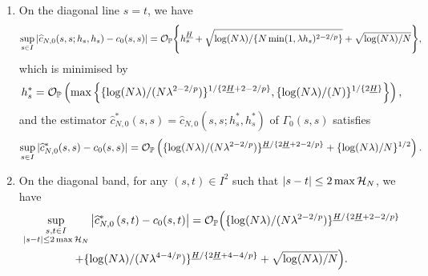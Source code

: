 \documentclass{article}
\begin{document}
\begin{theorem}
\begin{enumerate}
	\item \label{eq:thm:cov_unif_cv_diagonal} On the diagonal line $s=t$, we have
	 	\begin{equation}
	 		\sup_{s\in I} \left|\widehat c_{N,0} (s,s;h_s,h_s) -  c_0 (s,s)\right| =  \mathcal{O}_{\mathbb{P}}\Biggl\{h_s^{\underline{H}} + \sqrt{\log(N \lambda) /\{N\min(1,\lambda h_s)^{2-2/p}\}} + \sqrt{\log(N\lambda) / N} \Biggr\},
	 	\end{equation}
	 	which is minimised by 
	 	\begin{equation}
	 		h_s^*  = \mathcal{O}_{\mathbb{P}}\left( \max\left\{\{{\log(N \lambda)} / (N \lambda^{2-2/p})\}^{1 / \{2\underline{H} + 2 -2/p\}}, \{{\log(N \lambda)} / (N)\}^{1 / \{2\underline{H}\}}\right\}\right),
	 	\end{equation}
	 	and the estimator $\widehat c_{N,0}^* (s,s) = \widehat c_{N,0} (s,s;h_s^*,h_s^*) $ of $\Gamma_0(s,s)$ satisfies
	 	\begin{equation}
	 		\sup_{s\in I}|\widehat c_{N,0}^* (s,s) - c_0(s,s)| = \mathcal{O}_{\mathbb{P}}\left( \{{\log(N \lambda)} / (N \lambda^{2-2 /p})\}^{\underline{H} / \{2\underline{H} + 2 -2/p\}} + \{{\log(N \lambda)} / N\}^{1 / 2}\right).
	 	\end{equation}
	 	
	 	\item \label{eq:thm:cov_unif_cv_diagonal_band} On the diagonal band, for any $(s, t) \in I^2$ such that $|s - t| \leq 2\max\mathcal{H}_N$, we have
	 	\begin{multline}
	 		\sup_{\substack{s, t \in I\\ |s - t| \leq 2\max\mathcal{H}_N}}\left|\widehat{c}_{N, 0}^*\left(s,t\right) - c_0(s,t)\right| =\mathcal{O}_{\mathbb{P}}\Bigl( \{\log(N \lambda) / (N\lambda^{2-2/p})\}^{\underline{H} / \{2 \underline{H}+2-2/p \}} \\ + \{\log(N \lambda) / (N\lambda^{4-4/p})\}^{\underline{H} / \{2 \underline{H}+4-4/p \}} + \sqrt{\log(N\lambda)/N} \Bigr).
	 	\end{multline}
	\end{enumerate}
\end{theorem}







\end{document}
